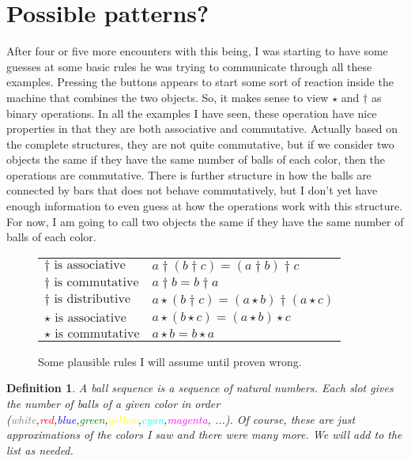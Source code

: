 \documentclass[12pt]{article}
\newtheorem{definition}{Definition}
\begin{document}
\section{Possible patterns?}

After four or five more encounters with this being, I was starting to have some guesses at some basic rules he was trying to communicate through all these examples.
Pressing the buttons appears to start some sort of reaction inside the machine that combines the two objects.  So, it makes sense to view $\star$ and $\dagger$ as binary operations.
In all the examples I have seen, these operation have nice properties in that they are both associative and commutative.  Actually based on the complete structures, they are not quite commutative, but if we consider
two objects the same if they have the same number of balls of each color, then the operations are commutative.  There is further structure in how the balls are connected by bars that
does not behave commutatively, but I don't yet have enough information to even guess at how the operations work with this structure.  For now, I am going to call two objects the same if they have the same number of balls of each color.

\begin{figure}
\centering
\begin{tabular}{l|l}
$\dagger \text{ is associative}$ & $a\dagger(b\dagger c) = (a\dagger b) \dagger c$\\
$\dagger \text{ is commutative}$ & $a \dagger b = b\dagger a$\\
$\dagger \text{ is distributive}$ & $a\star (b \dagger c) = (a\star b)\dagger(a\star c)$\\
$\star \text{ is associative}$ & $a\star(b\star c) = (a\star b) \star c$\\
$\star \text{ is commutative}$ & $a \star b = b\star a$\\
\end{tabular}
\caption{Some plausible rules I will assume until proven wrong.}
\end{figure} 


\begin{definition}
A \emph{ball sequence} is a sequence of natural numbers.  Each slot gives the number of balls of a given color in order 
(\textcolor{gray}{white},\textcolor{red}{red},\textcolor{blue}{blue},\textcolor{green}{green},\textcolor{yellow}{yellow},\textcolor{cyan}{cyan},\textcolor{magenta}{magenta}, ...).
Of course, these are just approximations of the colors I saw and there were many more.  We will add to the list as needed.
\end{definition}
\end{document}
